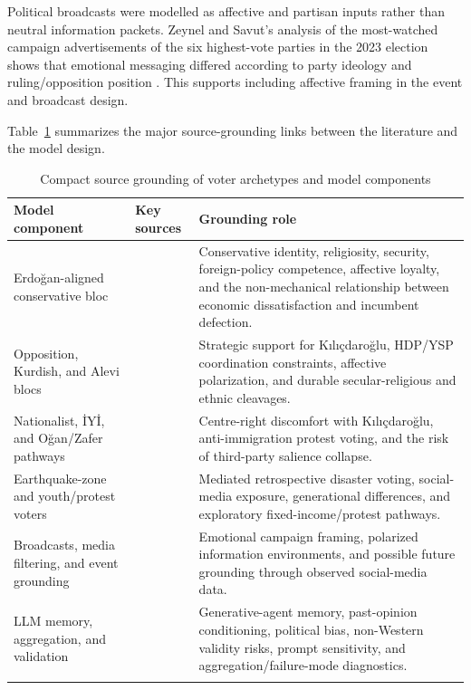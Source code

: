 \documentclass[pdflatex,sn-mathphys-num,iicol]{sn-jnl}
\begin{document}
Political broadcasts were modelled as affective and partisan inputs rather than
neutral information packets. Zeynel and Savut's analysis of the most-watched
campaign advertisements of the six highest-vote parties in the 2023 election
shows that emotional messaging differed according to party ideology and
ruling/opposition position \cite{zeynel2024duygular}. This supports including
affective framing in the event and broadcast design.

Table~\ref{tab:sourcegrounding} summarizes the major source-grounding links
between the literature and the model design.

\begin{table}[t]
\caption{Compact source grounding of voter archetypes and model components}
\label{tab:sourcegrounding}
\centering\footnotesize
\begin{tabular}{@{}p{}p{}p{}@{}}
\toprule
Model component & Key sources & Grounding role \\
\midrule
Erdoğan-aligned conservative bloc &
\cite{carkoglu2024unlikely,aytac2025polarised,cinkara2025erdogan,yildirim2025sege} &
Conservative identity, religiosity, security, foreign-policy competence,
affective loyalty, and the non-mechanical relationship between economic
dissatisfaction and incumbent defection. \\
Opposition, Kurdish, and Alevi blocs &
\cite{carkoglu2024unlikely,baruh2024difficult,aytac2025polarised,ilbiz2023securitization,ozbudun2013cleavages,ysp2023manifesto} &
Strategic support for Kılıçdaroğlu, HDP/YSP coordination constraints,
affective polarization, and durable secular-religious and ethnic cleavages. \\
Nationalist, İYİ, and Oğan/Zafer pathways &
\cite{baruh2024difficult,gerim2025victory,karaca2024socialmedia,kang2026dynamok} &
Centre-right discomfort with Kılıçdaroğlu, anti-immigration protest voting,
and the risk of third-party salience collapse. \\
Earthquake-zone and youth/protest voters &
\cite{sevinc2024afet,hafizoglu2021z,karaca2024socialmedia,carkoglu2024unlikely} &
Mediated retrospective disaster voting, social-media exposure, generational
differences, and exploratory fixed-income/protest pathways. \\
Broadcasts, media filtering, and event grounding &
\cite{zeynel2024duygular,bozdag2022skeptical,najafi2024dataset} &
Emotional campaign framing, polarized information environments, and possible
future grounding through observed social-media data. \\
LLM memory, aggregation, and validation &
\cite{park2023generative,hwang2023aligning,kang2026dynamok,kreutner2026ep,qu2024performance,rettenberger2025politicalbias} &
Generative-agent memory, past-opinion conditioning, political bias,
non-Western validity risks, prompt sensitivity, and aggregation/failure-mode
diagnostics. \\
\botrule
\end{tabular}
\normalsize
\end{table}
\end{document}
